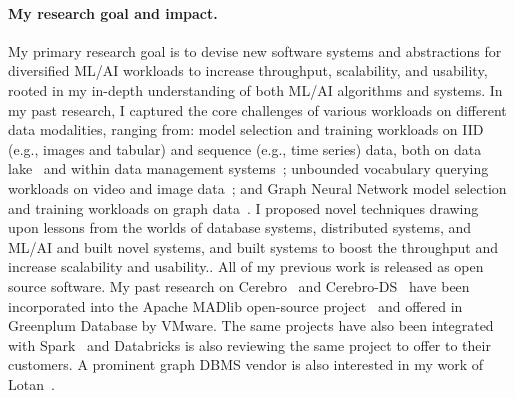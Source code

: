 \documentclass[letterpaper]{article}
\begin{document}
\paragraph{My research goal and impact.} My primary research goal is to devise new software systems and abstractions for diversified ML/AI workloads to increase throughput, scalability, and usability, rooted in my in-depth understanding of both ML/AI algorithms and systems. In my past research, I captured the core challenges of various workloads on different data modalities, ranging from: model selection and training workloads on IID (e.g., images and tabular) and sequence (e.g., time series) data, both on data lake~\cite{cerebro, cerebrodeem} and within data management systems~\cite{cerebro-ds}; unbounded vocabulary querying workloads on video and image data~\cite{panorama}; and Graph Neural Network model selection and training workloads on graph data~\cite{lotan}. I proposed novel techniques drawing upon lessons from the worlds of database systems, distributed systems, and ML/AI and built novel systems, and built systems to boost the throughput and increase scalability and usability.. All of my previous work is released as open source software. My past research on Cerebro~\cite{cerebro, cerebrodeem} and Cerebro-DS~\cite{cerebro-ds} have been incorporated into the Apache MADlib open-source project~\cite{madlibmop} and offered in Greenplum Database by VMware. The same projects have also been integrated with Spark~\cite{sparkmop} and Databricks is also reviewing the same project to offer to their customers. A prominent graph DBMS vendor is also interested in my work of Lotan~\cite{lotan}.



%
%
%
%
%
%
%
%
%
%
%
%
\end{document}
